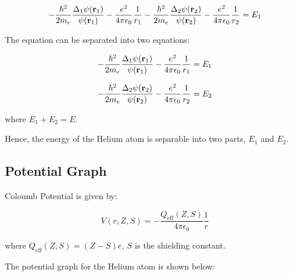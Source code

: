 \documentclass[11pt]{article}
\begin{document}
    \begin{equation}
      - \frac{\hbar^{2}}{2m_e}\frac{\Delta_1 \psi(\vb{r}_{1})}{\psi(\vb{r}_{1})} 
      - \frac{e^{2}}{4\pi\epsilon_0} \frac{1}{r_1} 
      - \frac{\hbar^{2}}{2m_e}\frac{\Delta_2 \psi(\vb{r}_{2})}{\psi(\vb{r}_{2})}
      - \frac{e^{2}}{4\pi\epsilon_0} \frac{1}{r_2}
      = E_1
    \end{equation}

    The equation can be separated into two equations:

    \begin{equation}
      - \frac{\hbar^{2}}{2m_e}\frac{\Delta_1 \psi(\vb{r}_{1})}{\psi(\vb{r}_{1})} 
      - \frac{e^{2}}{4\pi\epsilon_0} \frac{1}{r_1} 
      = E_1
    \end{equation}

    \begin{equation}
      - \frac{\hbar^{2}}{2m_e}\frac{\Delta_2 \psi(\vb{r}_{2})}{\psi(\vb{r}_{2})}
      - \frac{e^{2}}{4\pi\epsilon_0} \frac{1}{r_2}
      = E_2
    \end{equation}

    where $E_1 + E_2 = E$.

    Hence, the energy of the Helium atom is separable into two parts, $E_1$ and $E_2$.

    \newpage

    \subsection{Potential Graph}

    Coloumb Potential is given by:

    \begin{equation}
      V(r,Z,S) = - \frac{Q_{\text{eff}}(Z, S)}{4\pi\epsilon_0} \frac{1}{r}
    \end{equation}

    where $Q_{\text{eff}}(Z, S) = (Z - S)e$, $S$ is the shielding constant.

    The potential graph for the Helium atom is shown below:
\end{document}
